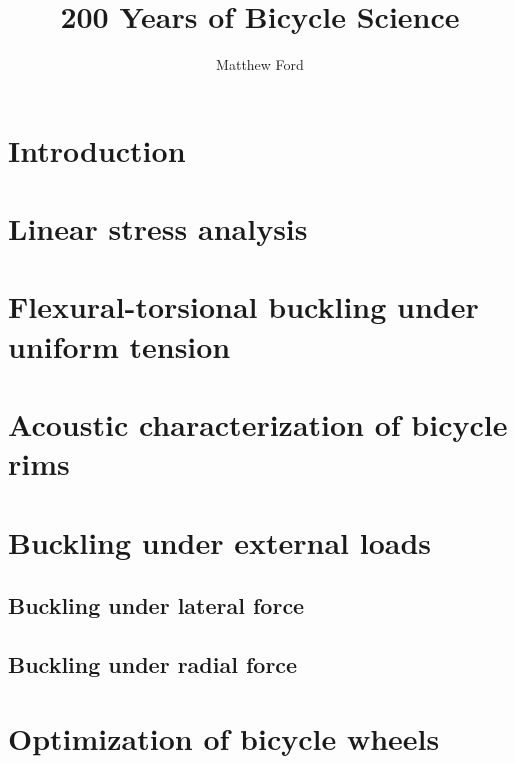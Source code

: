 \documentclass{nuthesis}
\begin{document}
\title{200 Years of Bicycle Science}
\author{Matthew Ford}

\maketitle


\tableofcontents


\chapter{Introduction}

\label{introduction}


\chapter{Linear stress analysis}

\label{stress_analysis}


\chapter{Flexural-torsional buckling under uniform tension}
\label{sec:TensionBuckling}



\chapter{Acoustic characterization of bicycle rims}

\label{acoustic_testing}


\chapter{Buckling under external loads}
\section{Buckling under lateral force}
\section{Buckling under radial force}


\chapter{Optimization of bicycle wheels}
\end{document}

